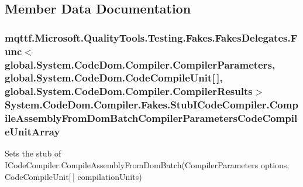 \subsection{Member Data Documentation}
\hypertarget{class_system_1_1_code_dom_1_1_compiler_1_1_fakes_1_1_stub_i_code_compiler_ae672c096341658599d5dfe926eba52d4}{
\subsubsection[{Compile\-Assembly\-From\-Dom\-Batch\-Compiler\-Parameters\-Code\-Compile\-Unit\-Array}]{\setlength{\rightskip}{0pt plus 5cm}mqttf.\-Microsoft.\-Quality\-Tools.\-Testing.\-Fakes.\-Fakes\-Delegates.\-Func$<$global.\-System.\-Code\-Dom.\-Compiler.\-Compiler\-Parameters, global.\-System.\-Code\-Dom.\-Code\-Compile\-Unit\mbox{[}$\,$\mbox{]}, global.\-System.\-Code\-Dom.\-Compiler.\-Compiler\-Results$>$ System.\-Code\-Dom.\-Compiler.\-Fakes.\-Stub\-I\-Code\-Compiler.\-Compile\-Assembly\-From\-Dom\-Batch\-Compiler\-Parameters\-Code\-Compile\-Unit\-Array}}\label{class_system_1_1_code_dom_1_1_compiler_1_1_fakes_1_1_stub_i_code_compiler_ae672c096341658599d5dfe926eba52d4}


Sets the stub of I\-Code\-Compiler.\-Compile\-Assembly\-From\-Dom\-Batch(\-Compiler\-Parameters options, Code\-Compile\-Unit\mbox{[}$\,$\mbox{]} compilation\-Units)

